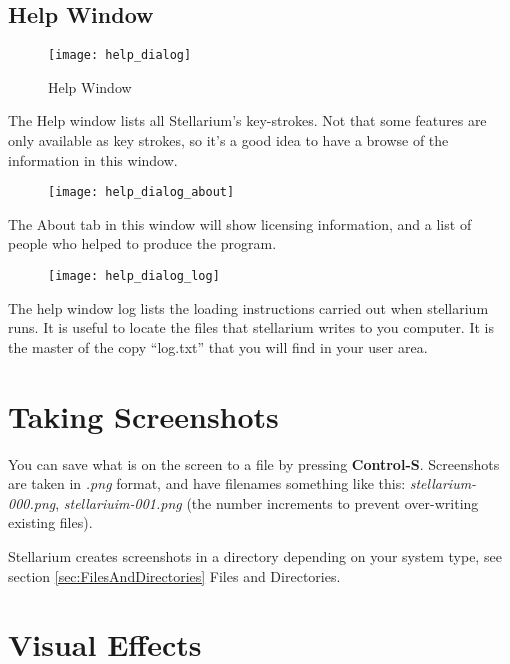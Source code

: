 \subsection{Help Window}

\begin{figure}[h]
\centering\texttt{[image: help\_dialog]}
\caption{Help Window}
\end{figure}

The Help window lists all Stellarium's key-strokes. Not that some
features are only available as key strokes, so it's a good idea to have
a browse of the information in this window.

\begin{figure}[h]
\centering\texttt{[image: help\_dialog\_about]}
\end{figure}

The About tab in this window will show licensing information, and a list
of people who helped to produce the program.

\begin{figure}[h]
\centering\texttt{[image: help\_dialog\_log]}
\end{figure}

The help window log lists the loading instructions carried out when
stellarium runs. It is useful to locate the files that stellarium writes
to you computer. It is the master of the copy ``log.txt'' that you will
find in your user area.


\section{Taking Screenshots}\label{taking-screenshots}

You can save what is on the screen to a file by pressing
\textbf{Control-S}. Screenshots are taken in \emph{.png} format, and
have filenames something like this: \emph{stellarium-000.png},
\emph{stellariuim-001.png} (the number increments to prevent
over-writing existing files).

Stellarium creates screenshots in a directory depending on
your system type, see section
\ref{sec:FilesAndDirectories} Files and Directories.




\section{Visual Effects}
\label{ch:VisualEffects}

